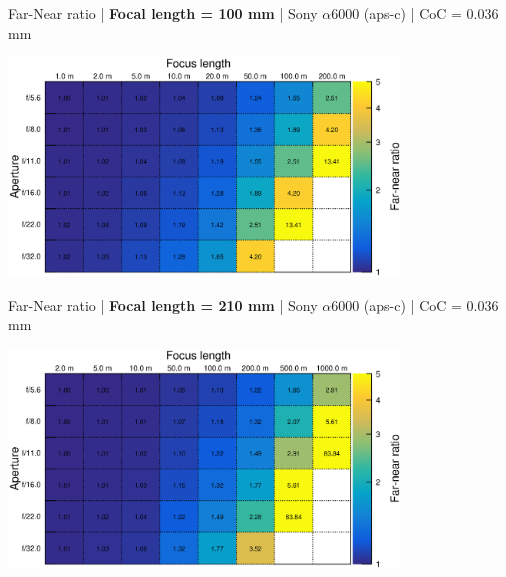 \documentclass[aspectratio=169]{beamer}
\begin{document}
\begin{frame}[plain]{}
  \vspace{1ex}
  \centering
  Far-Near ratio | {\bf Focal length = 100 mm} |  Sony $\alpha$\hspace{0.1em}6000 (aps-c) | CoC = 0.036 mm
  
  \includegraphics[center,width=0.78\textwidth]{img/far-near-ratio_focl100.eps}
\end{frame}

\begin{frame}[plain]{}
  \vspace{1ex}
  \centering
  Far-Near ratio | {\bf Focal length = 210 mm} |  Sony $\alpha$\hspace{0.1em}6000 (aps-c) | CoC = 0.036 mm
  
  \includegraphics[center,width=0.78\textwidth]{img/far-near-ratio_focl210.eps}
\end{frame}
\end{document}

